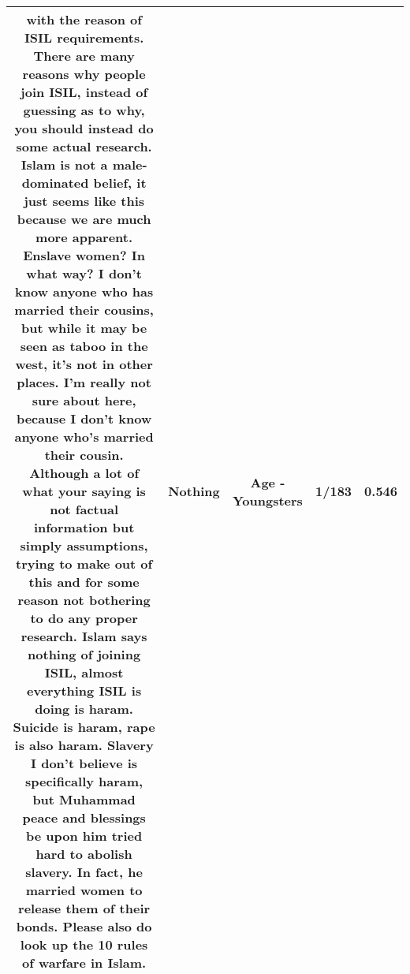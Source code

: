 \documentclass[11pt]{article}
\newlength\mylength
\begin{document}
\begin{center}
\begin{longtable}{|C{.65\mylength}|C{.30\mylength}|C{.12\mylength}|C{.12\mylength}|C{.12\mylength}|}
  \small with the reason of ISIL requirements. There are many reasons why people join ISIL, instead of guessing as to why, you should instead do some actual research. Islam is not a male-dominated belief, it just seems like this because we are much more apparent. Enslave women? In what way? I don't know anyone who has married their cousins, but while it may be seen as taboo in the west, it's not in other places. I'm really not sure about here, because I don't know anyone who's married their cousin. Although a lot of what your saying is not factual information but simply assumptions, trying to make out of this and for some reason not bothering to do any proper research. Islam says \textbf{nothing} of joining ISIL, almost everything ISIL is doing is haram. Suicide is haram, rape is also haram. Slavery I don't believe is specifically haram, but Muhammad peace and blessings be upon him tried hard to abolish slavery. In fact, he married women to release them of their bonds. Please also do look up the 10 rules of warfare in Islam.\normalsize   & Nothing & Age - Youngsters & 1/183 & 0.546 \\  \hline

\end{longtable}
\end{center}
\end{document}
